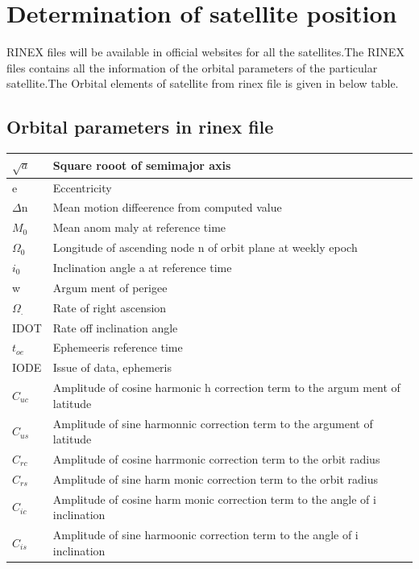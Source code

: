 \documentclass[10pt]{book}
\begin{document}
\section{Determination of satellite position}
RINEX files will be available in official websites for all the satellites.The RINEX files contains all the information of the orbital parameters of the particular satellite.The Orbital elements of satellite from rinex file is given in below table.
\subsection{Orbital parameters in rinex file}
\begin{tabular}{ | m{10em} | m{10cm} | } 
  \hline
  $\sqrt{a}$   & Square rooot of semimajor axis \\
  \hline
  e & 
  Eccentricity \\  
  \hline
  $\Delta$n & Mean motion diffeerence from computed value  \\
  \hline
  $M_0$ & Mean anom
  maly at reference time \\
  \hline
  $\Omega_0$ & Longitude of ascending node
  n
  of orbit plane at weekly epoch  \\
  \hline
  $i_0$ & Inclination angle
  a
  at reference time   \\
  \hline
  w & Argum
  ment of perigee \\
  \hline
$\Omega_.$& Rate of right ascension  \\
  \hline
  IDOT & Rate off inclination angle  \\
  \hline
$t_{oe}$  & Ephemeeris reference time  \\
  \hline
  IODE  &  Issue of data, ephemeris \\
  \hline
  $C_{uc}$ & Amplitude of cosine harmonic
  h
  correction term to the
  argum
  ment of latitude   \\
  \hline
  $C_{us}$& Amplitude of sine harmonnic correction term to the argument
  of latitude \\
  \hline
  $C_{rc}$  &  Amplitude of cosine harrmonic correction term to the orbit
  radius \\
  \hline
  $C_{rs}$ & Amplitude of sine harm
  monic correction term to the orbit
  radius  \\
  \hline
  $C_{ic}$ & Amplitude of cosine harm
  monic correction term to the angle of
  i
  inclination \\
  \hline
  $C_{is}$ & Amplitude of sine harmoonic correction term to the angle of
  i
  inclination  \\
  \hline
\end{tabular}
\end{document}
